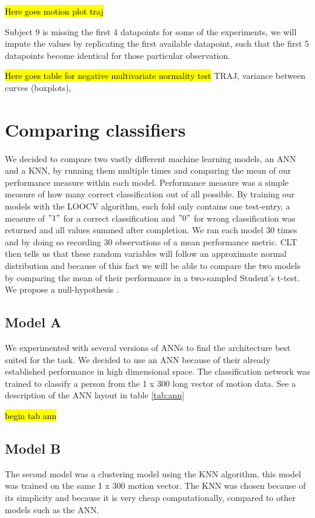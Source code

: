 \documentclass{article}
\begin{document}
\hl{Here goes motion plot traj}

Subject 9 is missing the first 4 datapoints for some of the experiments, we will impute the values by replicating the first available datapoint, such that the first 5 datapoints become identical for those particular observation.

\hl{Here goes table for negative multivariate normality test}
TRAJ, variance between curves (boxplots), 

\section{Comparing classifiers}
We decided to compare two vastly different machine learning models, an ANN and a KNN, by running them multiple times and comparing the mean of our performance measure within each model. Performance measure was a simple measure of how many correct classification out of all possible. By training our models with the LOOCV algorithm, each fold only contains one test-entry, a measure of $"1"$ for a correct classification and $"0"$ for wrong classification was returned and all values summed after completion. We ran each model 30 times and by doing so recording 30 observations of a mean performance metric. CLT then tells us that these random variables will follow an approximate normal distribution and because of this fact we will be able to compare the two models by comparing the mean of their performance in a two-sampled Student's t-test.\\



We propose a null-hypothesis . 
\subsection{Model A}
We experimented with several versions of ANNs to find the architecture best suited for the task. We decided to use an ANN because of their already established performance in high dimensional space. The classification network was trained to classify a person from the 1 x 300 long vector of motion data. See a description of the ANN layout in table \ref{tab:ann} 

\hl{begin tab ann}


\subsection{Model B}
The second model was a clustering model using the KNN algorithm, this model was trained on the same 1 x 300 motion vector.
The KNN was chosen because of its simplicity and because it is very cheap computationally, compared to other models such as the ANN.
\end{document}
